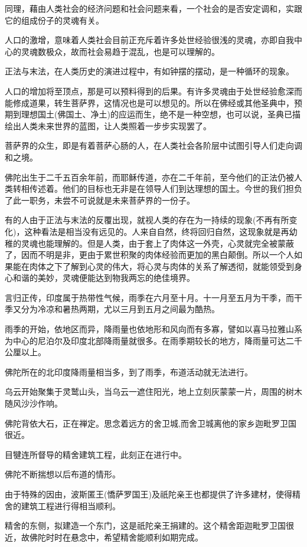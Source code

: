 \documentclass[twoside,openany]{book}
\begin{document}
同理，藉由人类社会的经济问题和社会问题来看，一个社会的是否安定调和，实跟它的组成份子的灵魂有关。

人口的激增，意味着人类社会目前正充斥着许多处世经验很浅的灵魂，亦即自我中心的灵魂数极众，故而社会易趋于混乱，也是可以理解的。

正法与末法，在人类历史的演进过程中，有如钟摆的摆动，是一种循环的现象。

人口的增加将至顶点，那是可以预料得到的后果。有许多灵魂由于处世经验愈深而能修成道果，转生菩萨界，这情况也是可以想见的。所以在佛经或其他圣典中，预期到理想国土(佛国土、净土)的应运而生，绝不是一种空想，也可以说，圣典已描绘出人类未来世界的蓝图，让人类照着一步步实现罢了。

菩萨界的众生，即是有着菩萨心肠的人，在人类社会各阶层中试图引导人们走向调和之境。

佛陀出生于二千五百余年前，而耶稣传道，亦在二千年前，至今他们的正法仍被人类转相传述着。他们的目标也无非是在领导人们到达理想的国土。今世的我们担负了此一职务，未尝不可说就是未来菩萨界的一份子。

有的人由于正法与末法的反覆出现，就视人类的存在为一持续的现象(不再有所变化)，这种看法是相当没有远见的。人来自自然，终将回归自然，这现象就是再幼稚的灵魂也能理解的。但是人类，由于套上了肉体这一外壳，心灵就完全被蒙蔽了，因而不明是非，更由于累世积聚的肉体经验而更加的黑白颠倒。所以一个人如果能在肉体之下了解到心灵的伟大，将心灵与肉体的关系了解透彻，就能领受到身心和谐的美妙，灵魂便能达到物我两忘的绝佳境界。

言归正传，印度属于热带性气候，雨季在六月至十月。十一月至五月为干季，而干季又分为冷凉和暑热两期，尤以三月到五月之间最为酷热。

雨季的开始，依地区而异，降雨量也依地形和风向而有多寡，譬如以喜马拉雅山系为中心的尼泊尔及印度北部降雨量就很多。在雨季期较长的地方，降雨量可达二千公厘以上。

佛陀所在的北印度降雨量相当多，到了雨季，布道活动就无法进行。

乌云开始聚集于灵鹫山头，当乌云一遮住阳光，地上立刻灰蒙蒙一片，周围的树木随风沙沙作响。

佛陀背依大石，正在禅定。思念着远方的舍卫城,而舍卫城离他的家乡迦毗罗卫国很近。

目犍连所督导的精舍建筑工程，此刻正在进行中。

佛陀不断揣想以后布道的情形。

由于特殊的因由，波斯匿王(憍萨罗国王)及祇陀亲王也都提供了许多建材，使得精舍的建筑工程进行得相当顺利。

精舍的东侧，拟建造一个东门，这是祇陀亲王捐建的。这个精舍距迦毗罗卫国很近，故佛陀时时在悬念中，希望精舍能顺利如期完成。
\end{document}
